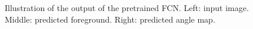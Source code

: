 \begin{figure}
\begin{center}
\caption{Illustration of the output of the pretrained FCN. Left: input image.
Middle: predicted foreground. Right: predicted angle map.}
\label{fig:fcn}
\end{center}
\end{figure}
